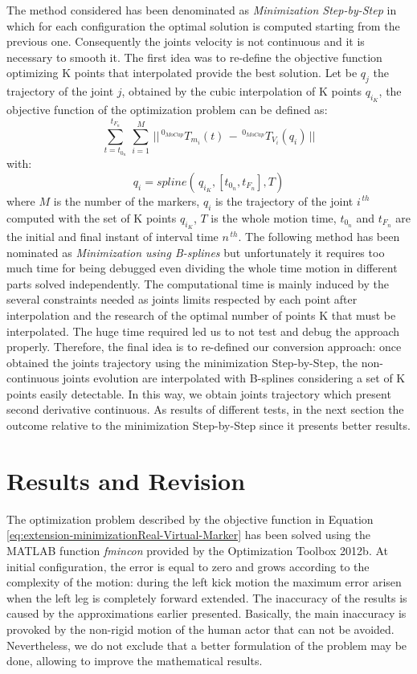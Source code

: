 \documentclass[a4paper, 10pt, conference]{ieeeconf}
\begin{document}
The method considered has been denominated as \textit{Minimization Step-by-Step} in which for each configuration the optimal solution is computed starting from the previous one.
Consequently the joints velocity is not continuous and it is necessary to smooth it.
The first idea was to re-define the objective function optimizing K points that interpolated provide the best solution. 
Let be $q_j$ the trajectory of the joint $j$, obtained by the cubic interpolation of K points $q_{i_K}$, the objective function of the optimization problem can be defined as:
\begin{equation}
\sum^{t_{F_n}}_{t = t_{0_n}} \, \sum^M_{i = 1} \, || \, ^{0_{MoCap}}T_{m_i}(t) \, - \, ^{0_{MoCap}}T_{V_i}(q_i) \, ||
\end{equation}
with:
\begin{equation}
q_i = spline(\,q_{i_K}, [ t_{0_n}, t_{F_n} ], T)
\end{equation}
where $M$ is the number of the markers, $q_i$ is the trajectory of the joint $i^{ \, th}$ computed with the set of K points $q_{i_K}$, $T$ is the whole motion time, $t_{0_n}$ and $t_{F_n}$ are the initial and final instant of interval time $n^{ \, th}$.
The following method has been nominated as \textit{Minimization using B-splines} but unfortunately it requires too much time for being debugged even dividing the whole time motion in different parts solved independently. The computational time is mainly induced by the several constraints needed as joints limits respected by each point after interpolation and the research of the optimal number of points K that must be interpolated. The huge time required led us to not test and debug the approach properly.
Therefore, the final idea is to re-defined our conversion approach: once obtained the joints trajectory using the minimization Step-by-Step, the non-continuous joints evolution are interpolated with B-splines considering a set of K points easily detectable.
In this way, we obtain joints trajectory which present second derivative continuous.
As results of different tests, in the next section the outcome relative to the minimization Step-by-Step since it presents better results.
\section{Results and Revision}
The optimization problem described by the objective function in Equation \eqref{eq:extension-minimizationReal-Virtual-Marker} has been solved using the MATLAB function \textit{fmincon} provided by the Optimization Toolbox 2012b. At initial configuration, the error is equal to zero and grows according to the complexity of the motion: during the left kick motion the maximum error arisen when the left leg is completely forward extended. 
The inaccuracy of the results is caused by the approximations earlier presented. Basically, the main inaccuracy is provoked by the non-rigid motion of the human actor that can not be avoided. Nevertheless, we do not exclude that a better formulation of the problem may be done, allowing to improve the mathematical results.
\end{document}
